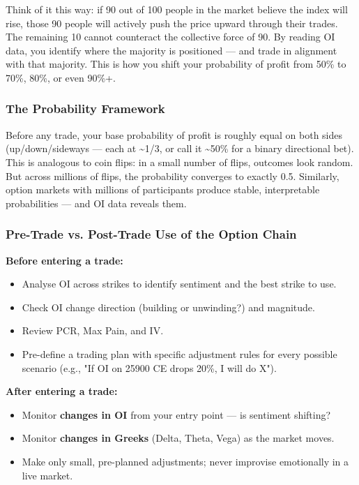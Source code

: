 \documentclass[12pt,openany]{book}
\begin{document}
Think of it this way: if 90 out of 100 people in the market believe the index will rise, those 90 people will actively push the price upward through their trades. The remaining 10 cannot counteract the collective force of 90. By reading OI data, you identify where the majority is positioned — and trade in alignment with that majority. This is how you shift your probability of profit from 50\% to 70\%, 80\%, or even 90\%+.

\subsubsection{The Probability Framework}

Before any trade, your base probability of profit is roughly equal on both sides (up/down/sideways — each at \textasciitilde{}1/3, or call it \textasciitilde{}50\% for a binary directional bet). This is analogous to coin flips: in a small number of flips, outcomes look random. But across millions of flips, the probability converges to exactly 0.5. Similarly, option markets with millions of participants produce stable, interpretable probabilities — and OI data reveals them.

\subsubsection{Pre-Trade vs. Post-Trade Use of the Option Chain}

\textbf{Before entering a trade:}
\begin{itemize}[leftmargin=*]
    \item Analyse OI across strikes to identify sentiment and the best strike to use.
    \item Check OI change direction (building or unwinding?) and magnitude.
    \item Review PCR, Max Pain, and IV.
    \item Pre-define a trading plan with specific adjustment rules for every possible scenario (e.g., "If OI on 25900 CE drops 20\%, I will do X").
\end{itemize}

\textbf{After entering a trade:}
\begin{itemize}[leftmargin=*]
    \item Monitor \textbf{changes in OI} from your entry point — is sentiment shifting?
    \item Monitor \textbf{changes in Greeks} (Delta, Theta, Vega) as the market moves.
    \item Make only small, pre-planned adjustments; never improvise emotionally in a live market.
\end{itemize}
\end{document}
